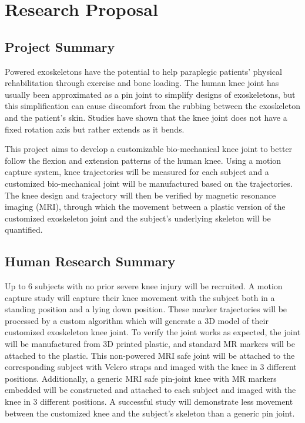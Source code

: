 \section{Research Proposal}
\subsection{Project Summary}

Powered exoskeletons have the potential to help paraplegic patients' physical rehabilitation through exercise and bone loading. The human knee joint has usually been approximated as a pin joint to simplify designs of exoskeletons, but this simplification can cause discomfort from the rubbing between the exoskeleton and the patient’s skin. Studies have shown that the knee joint does not have a fixed rotation axis but rather extends as it bends. 

This project aims to develop a customizable bio-mechanical knee joint to better follow the flexion and extension patterns of the human knee. Using a motion capture system, knee trajectories will be measured for each subject and a customized bio-mechanical joint will be manufactured based on the trajectories. The knee design and trajectory will then be verified by magnetic resonance imaging (MRI), through which the movement between a plastic version of the customized exoskeleton joint and the subject’s underlying skeleton will be quantified. 

\subsection{Human Research Summary}

 Up to 6 subjects with no prior severe knee injury will be recruited. A motion capture study will capture their knee movement with the subject both in a standing position and a lying down position. These marker trajectories will be processed by a custom algorithm which will generate a 3D model of their customized exoskeleton knee joint. To verify the joint works as expected, the joint will be manufactured from 3D printed plastic, and standard MR markers will be attached to the plastic. This non-powered MRI safe joint will be attached to the corresponding subject with Velcro straps and imaged with the knee in 3 different positions. Additionally, a generic MRI safe pin-joint knee with MR markers embedded will be constructed and attached to each subject and imaged with the knee in 3 different positions. A successful study will demonstrate less movement between the customized knee and the subject’s skeleton than a generic pin joint. 

